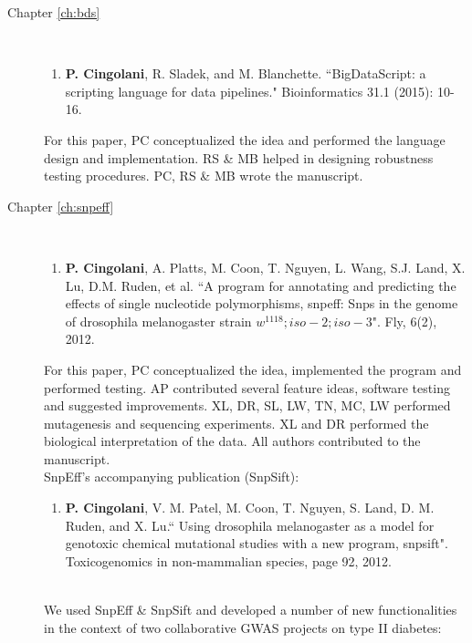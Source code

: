 \begin{description}
	
	\item[Chapter \ref{ch:bds}] ~ 
	
		\begin{enumerate}
			\item \textbf{P. Cingolani}, R. Sladek, and M. Blanchette. ``BigDataScript: a scripting language for data pipelines." Bioinformatics 31.1 (2015): 10-16.
		\end{enumerate}

		For this paper, PC conceptualized the idea and performed the language design and implementation. RS \& MB helped in designing robustness testing procedures. PC, RS \& MB wrote the manuscript.
		\\
	
	\item[Chapter \ref{ch:snpeff}] ~
	
		\begin{enumerate}[resume]
			\item \textbf{P. Cingolani}, A. Platts, M. Coon, T. Nguyen, L. Wang, S.J. Land, X. Lu, D.M. Ruden, et al. ``A program for annotating and predicting the effects of single nucleotide polymorphisms, snpeff: Snps in the genome of drosophila melanogaster strain $w^{1118}; iso-2; iso-3$". Fly, 6(2), 2012.
		\end{enumerate}

		For this paper, PC conceptualized the idea, implemented the program and performed testing.
		AP contributed several feature ideas, software testing and suggested improvements.
		XL, DR, SL, LW, TN, MC, LW performed mutagenesis and sequencing experiments.
		XL and DR performed the biological interpretation of the data.
		All authors contributed to the manuscript.
		\\

		SnpEff's accompanying publication (SnpSift):
	
		\begin{enumerate}[resume]		
			\item \textbf{P. Cingolani}, V. M. Patel, M. Coon, T. Nguyen, S. Land, D. M. Ruden, and X. Lu.`` Using drosophila melanogaster as a model for genotoxic chemical mutational studies with a new program, snpsift". Toxicogenomics in non-mammalian species, page 92, 2012.
		\end{enumerate}
		
		~ \\

		We used SnpEff \& SnpSift and developed a number of new functionalities in the context of two collaborative GWAS projects on type II diabetes:
	

\end{description}
